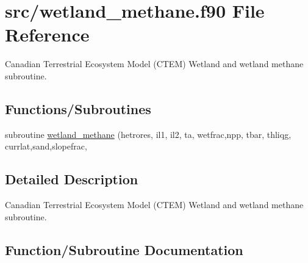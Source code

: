 \hypertarget{wetland__methane_8f90}{}\section{src/wetland\+\_\+methane.f90 File Reference}
\label{wetland__methane_8f90}


Canadian Terrestrial Ecosystem Model (C\+T\+E\+M) Wetland and wetland methane subroutine.  


\subsection*{Functions/\+Subroutines}
\begin{DoxyCompactItemize}
\item 
subroutine \hyperlink{wetland__methane_8f90_a6ebddfd9196f4a9458c8b0a8b1053f90}{wetland\+\_\+methane} (hetrores, il1, il2, ta, wetfrac,npp, tbar, thliqg, currlat,sand,slopefrac,
\end{DoxyCompactItemize}


\subsection{Detailed Description}
Canadian Terrestrial Ecosystem Model (C\+T\+E\+M) Wetland and wetland methane subroutine. 



\subsection{Function/\+Subroutine Documentation}
\hypertarget{wetland__methane_8f90_a6ebddfd9196f4a9458c8b0a8b1053f90}{}
